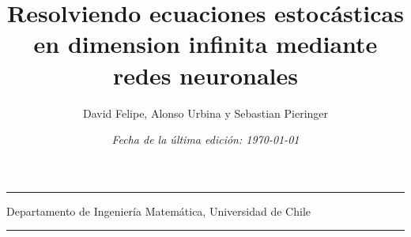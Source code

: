 \documentclass[11pt,letterpaper,notitlepage]{article}
\title{\Large Resolviendo ecuaciones estocásticas en dimension infinita mediante redes neuronales}
\author{\normalsize David Felipe, Alonso Urbina y Sebastian Pieringer}
\date{\normalsize \textit{Fecha de la última edición: \today}}
\begin{document}
\maketitle
\vspace{-3em}
\begin{center}
  \rule{\linewidth}{1pt}
  Departamento de Ingeniería Matemática, Universidad de Chile\\
  \rule{0.8\linewidth}{1pt}
\end{center}

\begingroup
\small
\let\clearpage\relax
\tableofcontents
\endgroup
\newpage










\newpage

\appendix









\newpage

\nocite{*}

\end{document}
